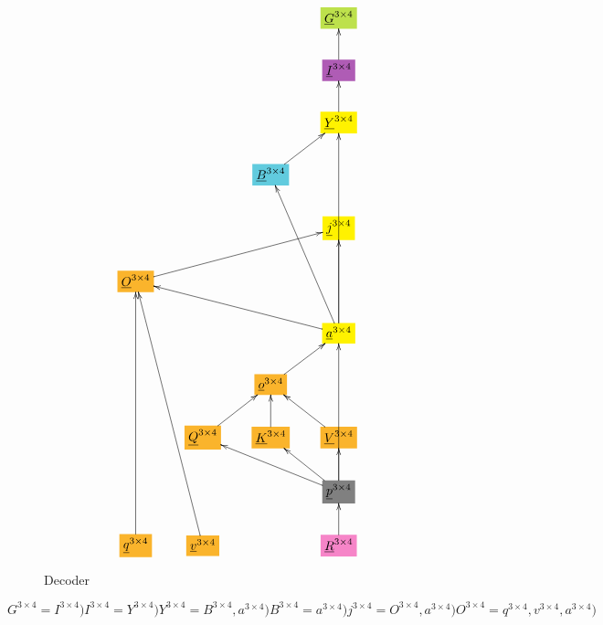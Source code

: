 \documentclass[12pt]{article}
\begin{document}
\begin{figure}[h!]\centering
$$\xymatrix{
&&&*+[F*:SpringGreen]{\underline{G}^{3\times  4}}
\\
&&&*+[F*:Orchid]{\underline{I}^{3\times  4}}\ar[u]
\\
&&&*+[F*:yellow]{\underline{Y}^{3\times  4}}\ar[u]
\\
&&*+[F*:SkyBlue]{\underline{B}^{3\times  4}}\ar[ur]&
\\
&&&*+[F*:yellow]{\underline{j}^{3\times  4}}
\\
*+[F*:Dandelion]{\underline{O}^{3\times  4}}\ar[urrr]&&&
\\
&&&*+[F*:yellow]{\underline{a}^{3\times  4}}\ar[uuuu]\ar[uuul]\ar[uu]\ar[ulll]
\\
&&*+[F*:Dandelion]{\underline{o}^{3\times  4}}\ar[ur]&
\\
&*+[F*:Dandelion]{\underline{Q}^{3\times  4}}\ar[ur]&*+[F*:Dandelion]{\underline{K}^{3\times  4}}\ar[u]&*+[F*:Dandelion]{\underline{V}^{3\times  4}}\ar[ul]
\\
&&&*+[F*:gray]{\underline{p}^{3\times  4}}\ar[uuu]\ar[ull]\ar[ul]\ar[u]
\\
*+[F*:Dandelion]{\underline{q}^{3\times  4}}\ar[uuuuu]&*+[F*:Dandelion]{\underline{v}^{3\times  4}}\ar[uuuuul]&&*+[F*:Lavender]{\underline{R}^{3\times  4}}\ar[u]
}$$
\caption{Decoder}
\label{fig-texnn-for-decoder}
\end{figure}\begin{subequations}
\begin{equation}
G^{3\times  4} = I^{3\times  4})
\label{eq-G-fun-decoder}
\end{equation}

\begin{equation}
I^{3\times  4} = Y^{3\times  4})
\label{eq-I-fun-decoder}
\end{equation}

\begin{equation}
Y^{3\times  4} = B^{3\times  4},a^{3\times  4})
\label{eq-Y-fun-decoder}
\end{equation}

\begin{equation}
B^{3\times  4} = a^{3\times  4})
\label{eq-B-fun-decoder}
\end{equation}

\begin{equation}
j^{3\times  4} = O^{3\times  4},a^{3\times  4})
\label{eq-j-fun-decoder}
\end{equation}

\begin{equation}
O^{3\times  4} = q^{3\times  4},v^{3\times  4},a^{3\times  4})
\label{eq-O-fun-decoder}
\end{equation}


\end{subequations}
\end{document}
